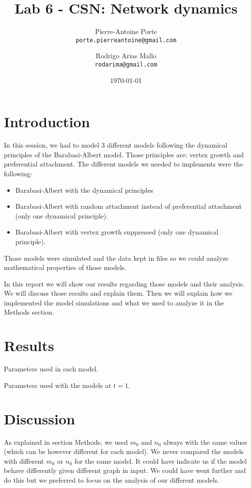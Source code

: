 \documentclass{article}
\title{Lab 6 - CSN: Network dynamics}
\author{Pierre-Antoine Porte \\ \texttt{porte.pierreantoine@gmail.com}
\and Rodrigo Arias Mallo \\ \texttt{rodarima@gmail.com}}
\date{\today}
\begin{document}
\maketitle

\section*{Introduction}

In this session, we had to model 3 different models following the dynamical 
principles of the Barabasi-Albert model. Those principles are: vertex growth and 
preferential attachment. The different models we needed to implements were the 
following:

\begin{itemize}
	\item Barabasi-Albert with the dynamical principles
	\item Barabasi-Albert with random attachment instead of preferential 
	attachment (only one dynamical principle).
	\item Barabasi-Albert with vertex growth suppressed (only one dynamical 
	principle).
\end{itemize}

Those models were simulated and the data kept in files so we could analyze 
mathematical properties of those models.

In this report we will show our results regarding those models and their 
analysis. We will discuss those results and explain them. Then we will explain 
how we implemented the model simulations and what we used to analyze it in the 
Methods section.

\section*{Results}
%
\begin{table}[h]
	\centering
	
	\caption{Parameters used in each model.}
	\label{tab:param_dd}
\end{table}
\begin{table}[h]
	\centering
	
	\caption{Parameters used with the models at $t = 1$.}
	\label{tab:param_dt1}
\end{table}
%

\section*{Discussion}

As explained in section Methods, we used $m_0$ and $n_0$ always with the same 
values (which can be however different for each model). We never compared the 
models with different $m_0$ or $n_0$ for the same model. It could have indicate 
us if the model behave differently given different graph in input. We could have 
went further and do this but we preferred to focus on the analysis of our 
different models.
\end{document}
